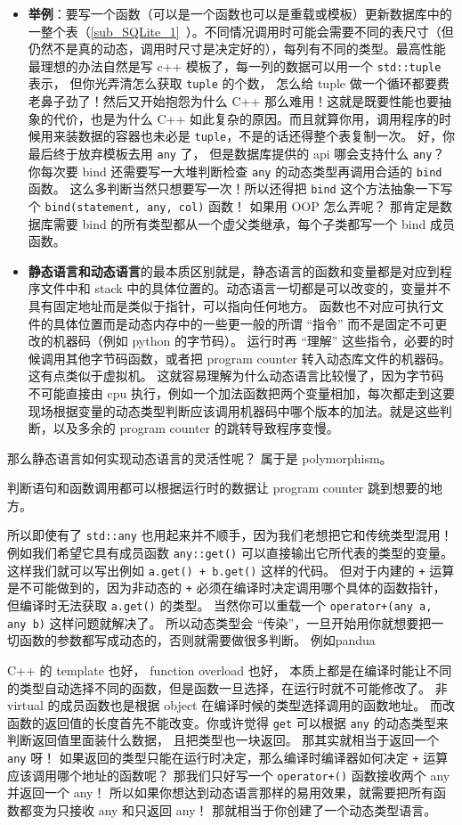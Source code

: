 \begin{itemize}
\item \textbf{举例}：要写一个函数（可以是一个函数也可以是重载或模板）更新数据库中的一整个表（\autoref{sub_SQLite_1}~）。不同情况调用时可能会需要不同的表尺寸（但仍然不是真的动态，调用时尺寸是决定好的），每列有不同的类型。最高性能最理想的办法自然是写 c++ 模板了，每一列的数据可以用一个 \verb`std::tuple` 表示， 但你光弄清怎么获取 \verb`tuple` 的个数， 怎么给 tuple 做一个循环都要费老鼻子劲了！然后又开始抱怨为什么 C++ 那么难用！这就是既要性能也要抽象的代价，也是为什么 C++ 如此复杂的原因。而且就算你用，调用程序的时候用来装数据的容器也未必是 \verb`tuple`，不是的话还得整个表复制一次。 好，你最后终于放弃模板去用 \verb`any` 了， 但是数据库提供的 api 哪会支持什么 \verb`any`？ 你每次要 bind 还需要写一大堆判断检查 \verb`any` 的动态类型再调用合适的 \verb`bind` 函数。 这么多判断当然只想要写一次！所以还得把 \verb`bind` 这个方法抽象一下写个 \verb`bind(statement, any, col)` 函数！ 如果用 OOP 怎么弄呢？ 那肯定是数据库需要 bind 的所有类型都从一个虚父类继承，每个子类都写一个 bind 成员函数。
\item \textbf{静态语言和动态语言}的最本质区别就是，静态语言的函数和变量都是对应到程序文件中和 stack 中的具体位置的。动态语言一切都是可以改变的，变量并不具有固定地址而是类似于指针，可以指向任何地方。 函数也不对应可执行文件的具体位置而是动态内存中的一些更一般的所谓 “指令” 而不是固定不可更改的机器码（例如 python 的字节码）。 运行时再 “理解” 这些指令，必要的时候调用其他字节码函数，或者把 program counter 转入动态库文件的机器码。 这有点类似于虚拟机。 这就容易理解为什么动态语言比较慢了，因为字节码不可能直接由 cpu 执行，例如一个加法函数把两个变量相加，每次都走到这要现场根据变量的动态类型判断应该调用机器码中哪个版本的加法。就是这些判断，以及多余的 program counter 的跳转导致程序变慢。
\end{itemize}

那么静态语言如何实现动态语言的灵活性呢？ 属于是 polymorphism。

判断语句和函数调用都可以根据运行时的数据让 program counter 跳到想要的地方。

所以即使有了 \verb`std::any` 也用起来并不顺手，因为我们老想把它和传统类型混用！例如我们希望它具有成员函数 \verb`any::get()` 可以直接输出它所代表的类型的变量。 这样我们就可以写出例如 \verb`a.get() + b.get()` 这样的代码。 但对于内建的 \verb`+` 运算是不可能做到的，因为非动态的 \verb`+` 必须在编译时决定调用哪个具体的函数指针，但编译时无法获取 \verb`a.get()` 的类型。 当然你可以重载一个 \verb`operator+(any a, any b)` 这样问题就解决了。 所以动态类型会 “传染”，一旦开始用你就想要把一切函数的参数都写成动态的，否则就需要做很多判断。 例如pandua

C++ 的 template 也好， function overload 也好， 本质上都是在编译时能让不同的类型自动选择不同的函数，但是函数一旦选择，在运行时就不可能修改了。 非 virtual 的成员函数也是根据 object 在编译时候的类型选择调用的函数地址。 而改函数的返回值的长度首先不能改变。你或许觉得 \verb`get` 可以根据 \verb`any` 的动态类型来判断返回值里面装什么数据， 且把类型也一块返回。 那其实就相当于返回一个 \verb`any` 呀！ 如果返回的类型只能在运行时决定，那么编译时编译器如何决定 \verb`+` 运算应该调用哪个地址的函数呢？ 那我们只好写一个 \verb`operator+()` 函数接收两个 any 并返回一个 any！ 所以如果你想达到动态语言那样的易用效果，就需要把所有函数都变为只接收 any 和只返回 any！ 那就相当于你创建了一个动态类型语言。
